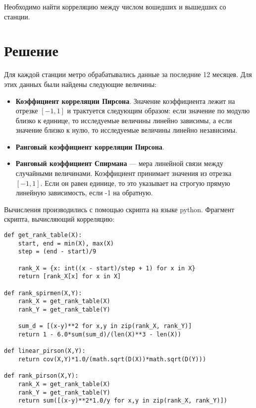 \documentclass[12pt,a4paper,oneside]{extarticle}
\begin{document}
    Необходимо найти корреляцию между числом вошедших и вышедших со станции.

\section{Решение}
    Для каждой станции метро обрабатывались данные за последние 12 месяцев. Для этих данных были найдены следующие величины:
    \begin{itemize}
        \item {\bf Коэффициент корреляции Пирсона}. Значение коэффициента лежит на отрезке $[-1, 1]$ и трактуется следующим образом: если значение по модулю близко к единице, то исследуемые величины линейно зависимы, а если значение близко к нулю, то исследуемые величины линейно независимы.
        \item {\bf Ранговый коэффициент корреляции Пирсона}.
        \item {\bf Ранговый коэффициент Спирмана} --- мера линейной связи между случайными величинами. Коэффициент принимает значения из отрезка $[-1, 1]$. Если он равен единице, то это указывает на строгую прямую линейную зависимость, если -1 на обратную.
    \end{itemize}

    Вычисления производились с помощью скрипта на языке python. Фрагмент скрипта, вычисляющий корреляцию:
    \begin{lstlisting}
def get_rank_table(X):
    start, end = min(X), max(X)
    step = (end - start)/9

    rank_X = {x: int((x - start)/step + 1) for x in X}
    return [rank_X[x] for x in X]

def rank_spirmen(X,Y):
    rank_X = get_rank_table(X)
    rank_Y = get_rank_table(Y)

    sum_d = [(x-y)**2 for x,y in zip(rank_X, rank_Y)]
    return 1 - 6.0*sum(sum_d)/(len(X)**3 - len(X))

def linear_pirson(X,Y):
    return cov(X,Y)*1.0/(math.sqrt(D(X))*math.sqrt(D(Y)))

def rank_pirson(X,Y):
    rank_X = get_rank_table(X)
    rank_Y = get_rank_table(Y)
    return sum([(x-y)**2*1.0/y for x,y in zip(rank_X, rank_Y)])
    \end{lstlisting}
    
\end{document}
